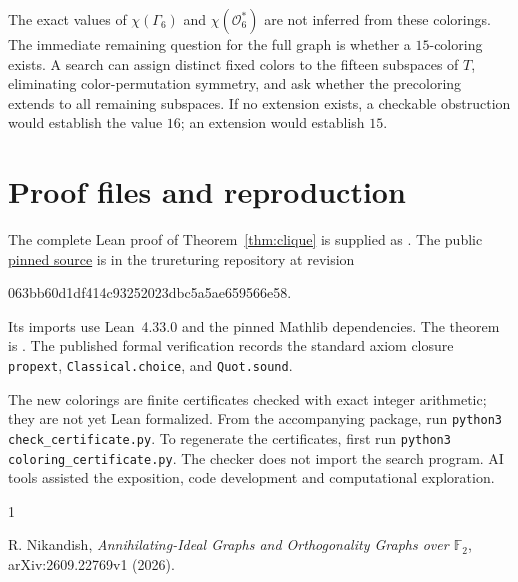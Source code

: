 \documentclass[11pt]{article}
\newcommand{\Oc}{\mathcal O}
\begin{document}
The exact values of $\chi(\Gamma_6)$ and $\chi(\Oc_6^*)$ are not inferred
from these colorings. The immediate remaining question for the full graph
is whether a $15$-coloring exists. A search can assign distinct fixed colors
to the fifteen subspaces of $T$, eliminating color-permutation symmetry,
and ask whether the precoloring extends to all remaining subspaces.
If no extension exists, a checkable obstruction would establish the value
$16$; an extension would establish $15$.

\section{Proof files and reproduction}

The complete Lean proof of Theorem~\ref{thm:clique} is supplied as
. The public
\href{https://github.com/the-omega-institute/trureturing/blob/063bb60d1df414c93252023dbc5a5ae659566e58/D5/S3/Combinatorics/Orthogonality/NikandishClique.lean}{pinned source}
is in the trureturing repository at revision
\begin{center}\small\ttfamily
063bb60d1df414c93252023dbc5a5ae659566e58.
\end{center}
Its imports use
Lean~4.33.0 and the pinned Mathlib dependencies. The theorem is
.
The published formal verification records the standard axiom closure
\texttt{propext}, \texttt{Classical.choice}, and \texttt{Quot.sound}.

The new colorings are finite certificates checked with exact integer
arithmetic; they are not yet Lean formalized. From the accompanying package,
run \texttt{python3 check\_certificate.py}. To regenerate the certificates,
first run \texttt{python3 coloring\_certificate.py}. The checker does not
import the search program. AI tools assisted the exposition, code development
and computational exploration.

\begin{thebibliography}{1}
\raggedright
{} R. Nikandish, \emph{Annihilating-Ideal Graphs and Orthogonality
Graphs over $\mathbb F_2$}, arXiv:2609.22769v1 (2026).
\end{thebibliography}
\end{document}
